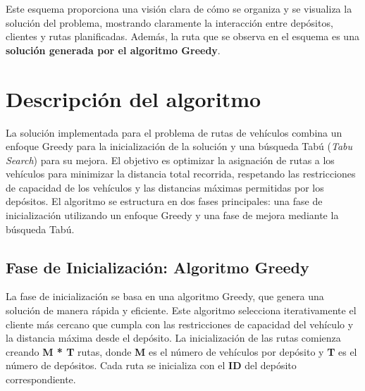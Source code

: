 \documentclass[letter, 10pt]{article}
\begin{document}
Este esquema proporciona una visión clara de cómo se organiza y se visualiza la solución del problema, mostrando claramente la interacción entre depósitos, clientes y rutas planificadas. Además, la ruta que se observa en el esquema es una \textbf{solución generada por el algoritmo Greedy}.

\section{Descripción del algoritmo}

La solución implementada para el problema de rutas de vehículos combina un enfoque Greedy para la inicialización de la solución y una búsqueda Tabú (\textit{Tabu Search}) para su mejora. El objetivo es optimizar la asignación de rutas a los vehículos para minimizar la distancia total recorrida, respetando las restricciones de capacidad de los vehículos y las distancias máximas permitidas por los depósitos. El algoritmo se estructura en dos fases principales: una fase de inicialización utilizando un enfoque Greedy y una fase de mejora mediante la búsqueda Tabú.

\subsection{Fase de Inicialización: Algoritmo Greedy}

La fase de inicialización se basa en una algoritmo Greedy, que genera una solución de manera rápida y eficiente. Este algoritmo selecciona iterativamente el cliente más cercano que cumpla con las restricciones de capacidad del vehículo y la distancia máxima desde el depósito. La inicialización de las rutas comienza creando \textbf{M * T} rutas, donde \textbf{M} es el número de vehículos por depósito y \textbf{T} es el número de depósitos. Cada ruta se inicializa con el \textbf{ID} del depósito correspondiente.
\end{document}
